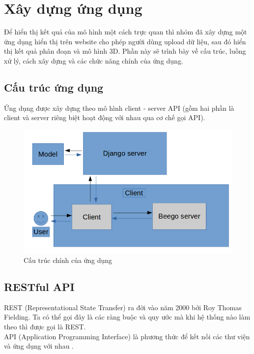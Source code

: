 \chapter{Xây dựng ứng dụng}
Để hiển thị kết quả của mô hình một cách trực quan thì nhóm đã xây dựng một ứng dụng hiển thị trên website cho phép người dùng upload dữ liệu, sau đó hiển thị kết quả phân đoạn và mô hình 3D. Phần này sẽ trình bày về cấu trúc, luồng xử lý, cách xây dựng và các chức năng chính của ứng dụng.
\section{Cấu trúc ứng dụng}
Ứng dụng được xây dựng theo mô hình client - server API (gồm hai phần là client và server riêng biệt hoạt động với nhau qua cơ chế gọi API).
\begin{figure}[h]
\centering
    \includegraphics[totalheight=7cm]{Images/app_struct.png}
    \caption{Cấu trúc chính của ứng dụng}
    \label{skip_conn}
\end{figure}
\section{RESTful API}
REST (Representational State Transfer) ra đời vào năm 2000 bởi Roy Thomas Fielding. Ta có thể gọi đây là các ràng buộc và quy ước mà khi hệ thống nào làm theo thì được gọi là REST.\\
API (Application Programming Interface) là phương thức để kết nối các thư viện và ứng dụng với nhau \cite{website:api}.\\

